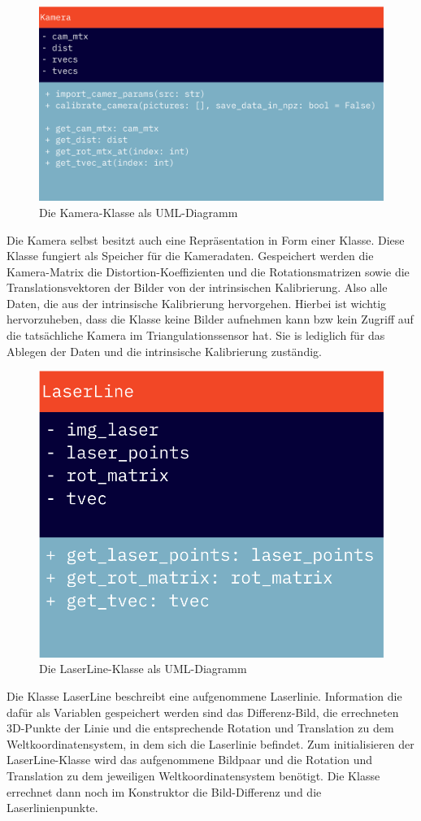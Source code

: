 		\begin{figure}[h]
			\centering
			\includegraphics[width=0.7\linewidth]{img/hauptteil/software/Kamera_UML.png}
			\caption{Die Kamera-Klasse als UML-Diagramm}
			\label{fig:kamera_uml}
		\end{figure}
		Die Kamera selbst besitzt auch eine Repräsentation in Form einer Klasse. Diese Klasse fungiert als Speicher für die Kameradaten. Gespeichert werden die Kamera-Matrix die Distortion-Koeffizienten und die Rotationsmatrizen sowie die Translationsvektoren der Bilder von der intrinsischen Kalibrierung. Also alle Daten, die aus der intrinsische Kalibrierung hervorgehen. Hierbei ist wichtig hervorzuheben, dass die Klasse keine Bilder aufnehmen kann bzw kein Zugriff auf die tatsächliche Kamera im Triangulationssensor hat. Sie is lediglich für das Ablegen der Daten und die intrinsische Kalibrierung zuständig.
		\newpage
		\begin{figure}[h]
			\centering
			\includegraphics[width=0.35\linewidth]{img/hauptteil/software/LaserLine_UML.png}
			\caption{Die LaserLine-Klasse als UML-Diagramm}
			\label{fig:laser_line_uml}
		\end{figure}
		Die Klasse LaserLine beschreibt eine aufgenommene Laserlinie. Information die dafür als Variablen gespeichert werden sind das Differenz-Bild, die errechneten 3D-Punkte der Linie und die entsprechende Rotation und Translation zu dem Weltkoordinatensystem, in dem sich die Laserlinie befindet. Zum initialisieren der LaserLine-Klasse wird das aufgenommene Bildpaar und die Rotation und Translation zu dem jeweiligen Weltkoordinatensystem benötigt. Die Klasse errechnet dann noch im Konstruktor die Bild-Differenz und die Laserlinienpunkte.\nocite{*}
		
